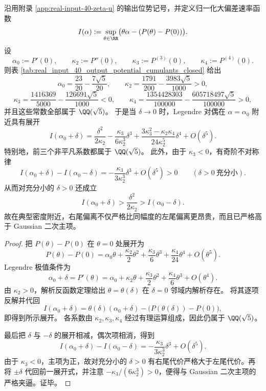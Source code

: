 \begin{theorem}\label{thm:xi-real-input-cramer-germ-quadratic-field-rigidity}
沿用附录 \ref{app:real-input-40-zeta-u} 的输出位势记号，并定义归一化大偏差速率函数
\[
I(\alpha):=\sup_{\theta\in\RR}\bigl(\theta\alpha-(P(\theta)-P(0))\bigr).
\]
设
\[
\alpha_0:=P'(0),\qquad
\kappa_2:=P''(0),\qquad
\kappa_3:=P^{(3)}(0),\qquad
\kappa_4:=P^{(4)}(0).
\]
则表 \ref{tab:real_input_40_output_potential_cumulants_closed} 给出
\[
\alpha_0=\frac{23}{20}-\frac{7\sqrt5}{20},
\qquad
\kappa_2=\frac{1791}{200}-\frac{3983\sqrt5}{1000}>0,
\]
\[
\kappa_3=\frac{1416369}{5000}-\frac{126691\sqrt5}{1000}<0,
\qquad
\kappa_4=\frac{1354428303}{100000}-\frac{605718497\sqrt5}{100000}>0,
\]
并且这些常数全部属于 \(\QQ(\sqrt5)\)。
于是当 \(\delta\to 0\) 时，Legendre 对偶在 \(\alpha=\alpha_0\) 附近具有展开
\[
\boxed{\;
I(\alpha_0+\delta)=
\frac{\delta^2}{2\kappa_2}
-\frac{\kappa_3}{6\kappa_2^3}\delta^3
+\frac{3\kappa_3^2-\kappa_2\kappa_4}{24\kappa_2^5}\delta^4
+O(\delta^5).\;}
\]
特别地，前三个非平凡系数都属于 \(\QQ(\sqrt5)\)。
此外，由于 \(\kappa_3<0\)，有奇阶不对称律
\[
\boxed{\;
I(\alpha_0+\delta)-I(\alpha_0-\delta)
=
-\frac{\kappa_3}{3\kappa_2^3}\delta^3
+O(\delta^5)
>0
\qquad(\delta>0\ \text{充分小}).\;}
\]
从而对充分小的 \(\delta>0\) 还成立
\[
I(\alpha_0+\delta)>\frac{\delta^2}{2\kappa_2}>I(\alpha_0-\delta).
\]
故在典型密度附近，右尾偏离不仅严格比同幅度的左尾偏离更昂贵，而且已严格高于 Gaussian 二次主项。
\end{theorem}
\begin{proof}
把 \(P(\theta)-P(0)\) 在 \(\theta=0\) 处展开为
\[
P(\theta)-P(0)
=
\alpha_0\theta+\frac{\kappa_2}{2}\theta^2+\frac{\kappa_3}{6}\theta^3+\frac{\kappa_4}{24}\theta^4+O(\theta^5).
\]
Legendre 极值条件为
\[
\alpha_0+\delta=P'(\theta)
=
\alpha_0+\kappa_2\theta+\frac{\kappa_3}{2}\theta^2+\frac{\kappa_4}{6}\theta^3+O(\theta^4).
\]
由 \(\kappa_2>0\)，解析反函数定理给出 \(\theta=\theta(\delta)\) 在 \(\delta=0\) 邻域内解析存在。
将其逐项反解并代回
\[
I(\alpha_0+\delta)=\theta(\delta)(\alpha_0+\delta)-\bigl(P(\theta(\delta))-P(0)\bigr),
\]
即得到所示展开。
各系数由 \(\kappa_2,\kappa_3,\kappa_4\) 经过有理运算组成，因此仍属于 \(\QQ(\sqrt5)\)。

最后把 \(\delta\) 与 \(-\delta\) 的展开相减，偶次项相消，得到
\[
I(\alpha_0+\delta)-I(\alpha_0-\delta)
=
-\frac{\kappa_3}{3\kappa_2^3}\delta^3+O(\delta^5).
\]
由于 \(\kappa_3<0\)，主项为正，故对充分小的 \(\delta>0\) 有右尾代价严格大于左尾代价。再将 \(\pm\delta\) 代回前一展开式，并注意 \(-\kappa_3/(6\kappa_2^3)>0\)，便得与 Gaussian 二次主项的严格夹逼。证毕。
\end{proof}

